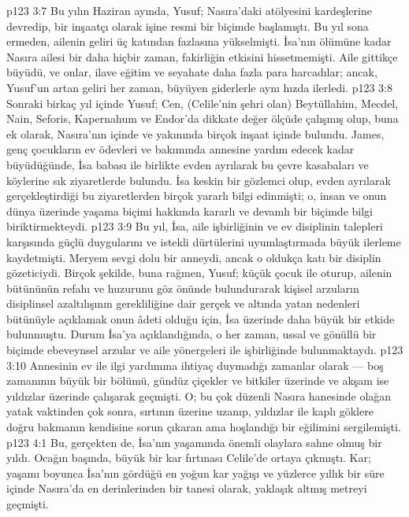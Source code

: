 \vs p123 3:7 Bu yılın Haziran ayında, Yusuf; Nasıra’daki atölyesini kardeşlerine devredip, bir inşaatçı olarak işine resmi bir biçimde başlamıştı. Bu yıl sona ermeden, ailenin geliri üç katından fazlasına yükselmişti. İsa’nın ölümüne kadar Nasıra ailesi bir daha hiçbir zaman, fakirliğin etkisini hissetmemişti. Aile gittikçe büyüdü, ve onlar, ilave eğitim ve seyahate daha fazla para harcadılar; ancak, Yusuf’un artan geliri her zaman, büyüyen giderlerle aynı hızda ilerledi.
\vs p123 3:8 Sonraki birkaç yıl içinde Yusuf; Cen, (Celile’nin şehri olan) Beytüllahim, Mecdel, Nain, Seforis, Kapernahum ve Endor’da dikkate değer ölçüde çalışmış olup, buna ek olarak, Nasıra’nın içinde ve yakınında birçok inşaat içinde bulundu. James, genç çocukların ev ödevleri ve bakımında annesine yardım edecek kadar büyüdüğünde, İsa babası ile birlikte evden ayrılarak bu çevre kasabaları ve köylerine sık ziyaretlerde bulundu. İsa keskin bir gözlemci olup, evden ayrılarak gerçekleştirdiği bu ziyaretlerden birçok yararlı bilgi edinmişti; o, insan ve onun dünya üzerinde yaşama biçimi hakkında kararlı ve devamlı bir biçimde bilgi biriktirmekteydi.
\vs p123 3:9 Bu yıl, İsa, aile işbirliğinin ve ev disiplinin talepleri karşısında güçlü duygularını ve istekli dürtülerini uyumlaştırmada büyük ilerleme kaydetmişti. Meryem sevgi dolu bir anneydi, ancak o oldukça katı bir disiplin gözeticiydi. Birçok şekilde, buna rağmen, Yusuf; küçük çocuk ile oturup, ailenin bütününün refahı ve huzurunu göz önünde bulundurarak kişisel arzuların disiplinsel azaltılışının gerekliliğine dair gerçek ve altında yatan nedenleri bütünüyle açıklamak onun âdeti olduğu için, İsa üzerinde daha büyük bir etkide bulunmuştu. Durum İsa’ya açıklandığında, o her zaman, ussal ve gönüllü bir biçimde ebeveynsel arzular ve aile yönergeleri ile işbirliğinde bulunmaktaydı.
\vs p123 3:10 Annesinin ev ile ilgi yardımına ihtiyaç duymadığı zamanlar olarak --- boş zamanının büyük bir bölümü, gündüz çiçekler ve bitkiler üzerinde ve akşam ise yıldızlar üzerinde çalışarak geçmişti. O; bu çok düzenli Nasıra hanesinde olağan yatak vaktinden çok sonra, sırtının üzerine uzanıp, yıldızlar ile kaplı göklere doğru bakmanın kendisine sorun çıkaran ama hoşlandığı bir eğilimini sergilemişti.
\vs p123 4:1 Bu, gerçekten de, İsa’nın yaşamında önemli olaylara sahne olmuş bir yıldı. Ocağın başında, büyük bir kar fırtınası Celile’de ortaya çıkmıştı. Kar; yaşamı boyunca İsa’nın gördüğü en yoğun kar yağışı ve yüzlerce yıllık bir süre içinde Nasıra’da en derinlerinden bir tanesi olarak, yaklaşık altmış metreyi geçmişti.
